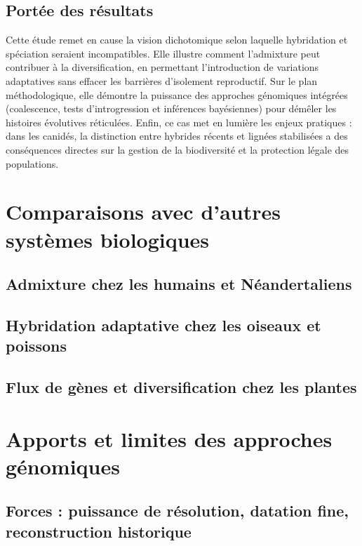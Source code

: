 \documentclass[12pt,a4paper]{article}
\begin{document}
\subsection{Portée des résultats}

Cette étude remet en cause la vision dichotomique selon laquelle hybridation et spéciation seraient incompatibles.
Elle illustre comment l’admixture peut contribuer à la diversification, en permettant l’introduction de variations adaptatives sans effacer les barrières d’isolement reproductif.
Sur le plan méthodologique, elle démontre la puissance des approches génomiques intégrées (coalescence, tests d’introgression et inférences bayésiennes) pour démêler les histoires évolutives réticulées.
Enfin, ce cas met en lumière les enjeux pratiques : dans les canidés, la distinction entre hybrides récents et lignées stabilisées a des conséquences directes sur la gestion de la biodiversité et la protection légale des populations.



\section{Comparaisons avec d’autres systèmes biologiques}
\subsection{Admixture chez les humains et Néandertaliens}
\subsection{Hybridation adaptative chez les oiseaux et poissons}
\subsection{Flux de gènes et diversification chez les plantes}

\section{Apports et limites des approches génomiques}
\subsection{Forces : puissance de résolution, datation fine, reconstruction historique}
\end{document}
